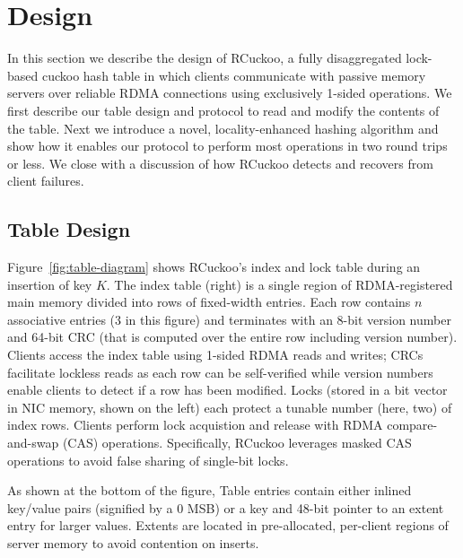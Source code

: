 \section{Design}
\label{sec:design}

In this section we describe the design of RCuckoo, a fully
disaggregated lock-based cuckoo hash table in which clients
communicate with passive memory servers over reliable RDMA connections
using exclusively 1-sided operations.  We first describe our table
design and protocol to read and modify the contents of the table.
Next we introduce a novel, locality-enhanced hashing algorithm and show
how it enables our protocol to perform most operations in two round
trips or less.  We close with a discussion of how RCuckoo detects and
recovers from client failures.

\subsection{Table Design}
\label{sec:table-design}

Figure~\ref{fig:table-diagram} shows RCuckoo's index and lock table
during an insertion of key $K$.  The index table (right) is a single
region of RDMA-registered main memory divided into rows of fixed-width
entries.  Each row contains $n$ associative entries (3 in this figure)
and terminates with an 8-bit version number and 64-bit CRC (that is
computed over the entire row including version number).  Clients
access the index table using 1-sided RDMA reads and writes; CRCs
facilitate lockless reads as each row can be self-verified while
version numbers enable clients to detect if a row has been modified.
Locks (stored in a bit vector in NIC memory, shown on the left) each
protect a tunable number (here, two) of index rows.  Clients perform
lock acquistion and release with RDMA compare-and-swap (CAS)
operations.  Specifically, RCuckoo leverages masked CAS operations to avoid
false sharing of single-bit locks.


As shown at the bottom of the figure, Table entries contain either
inlined key/value pairs (signified by a 0 MSB) or a key and 48-bit
pointer to an extent entry for larger values.
Extents are located in pre-allocated, per-client regions of server
memory to avoid contention on inserts.


